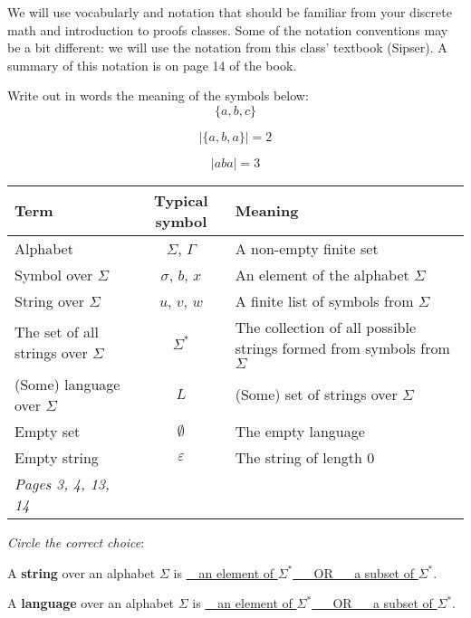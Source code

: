 
We will use vocabularly and notation that should be familiar from your discrete 
math and introduction to proofs classes.  Some of the notation conventions may 
be a bit different: we will use the notation from this class' textbook (Sipser). 
A summary of this notation is on page 14 of the book.

Write out in words the meaning of the symbols below: 
\[
    \{ a,b, c\}
\]

\phantom{The set whose elements are $a$, $b$, and $c$}

\[
    | \{a, b, a \} | = 2
\]


\[
    | aba | = 3
\]

\phantom{The length of the string $aba$ is $3$.}


\begin{center}
    \begin{tabular}{|p{2in}cp{4in}|}
    \hline
    Term & Typical symbol & Meaning \\
    \hline
    Alphabet & $\Sigma$, $\Gamma$ & A non-empty finite set	 \\
    Symbol over $\Sigma$  & $\sigma$, $b$, $x$ & An element of the alphabet $\Sigma$\\
    String over $\Sigma$  &	$u$, $v$, $w$ & A finite list of symbols from $\Sigma$\\
    The set of all strings over $\Sigma$ & $\Sigma^*$ & The collection of all possible strings formed from symbols from $\Sigma$ \\
    (Some) language over $\Sigma$& $L$ & (Some) set of strings over $\Sigma$ \\
    Empty set &$\emptyset$ & The empty language\\
    Empty string &$\varepsilon$ & The string of length $0$\\
    \hline
    {\it Pages 3, 4, 13, 14 }& \\
    \hline
    \end{tabular}
\end{center}

{\it Circle the correct choice}:

A {\bf string} over an alphabet $\Sigma$ is \underline{~~an element of $\Sigma^*$ ~~ OR ~~ a subset of $\Sigma^*$}.
    
A {\bf language} over an alphabet $\Sigma$ is \underline{~~an element of $\Sigma^*$ ~~ OR ~~ a subset of $\Sigma^*$}.


